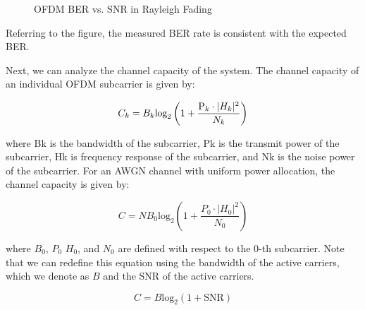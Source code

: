 \documentclass[conference]{IEEEtran}
\begin{document}
    		\begin{figure}[H]
			\centering
    			\caption{OFDM BER vs. SNR in Rayleigh Fading}
    			\label{fig::ofdm_fading_ber}
  	  	\end{figure}
  	  
  	  	Referring to the figure, the measured BER rate is consistent with the expected BER.
    	    	  
    	  Next, we can analyze the channel capacity of the system. The channel capacity of an individual OFDM subcarrier is given by:
    	  
    	  \begin{equation}
			C_{k} = B_{k}\text{log}_2\left(1 +\frac{ \text P_{k}\cdot|H_{k}|^2}{N_{k}}\right)
	    		\label{eq:ofdm_subcarrier_capacity}
	    	\end{equation}
	    	
	    	where Bk is the bandwidth of the subcarrier, Pk is the transmit power of the subcarrier, Hk is frequency response of the subcarrier, and Nk is the noise power of the subcarrier. For an AWGN channel with uniform power allocation, the channel capacity is given by:
	    	
	    	\begin{equation}
	    		C = NB_0\text{log}_2\left(1 + \frac{P_0\cdot|H_0|^2}{N_0}\right)
	    	\end{equation}
	    	
	    	where $B_0$, $P_0$ $H_0$, and $N_0$ are defined with respect to the 0-th subcarrier. Note that we can redefine this equation using the bandwidth of the active carriers, which we denote as $B$ and the SNR of the active carriers.
	    	
	    	\begin{equation}
	    		C = B\text{log}_2\left(1 + \text{SNR}\right)
	    	\end{equation} 
	    	
\end{document}
